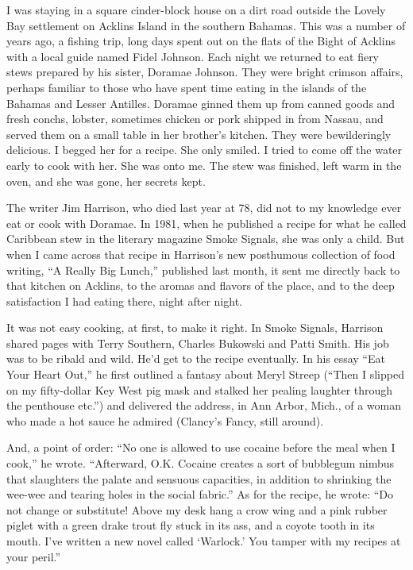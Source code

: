 I was staying in a square cinder-block house on a dirt road outside the
Lovely Bay settlement on Acklins Island in the southern Bahamas. This
was a number of years ago, a fishing trip, long days spent out on the
flats of the Bight of Acklins with a local guide named Fidel Johnson.
Each night we returned to eat fiery stews prepared by his sister,
Doramae Johnson. They were bright crimson affairs, perhaps familiar to
those who have spent time eating in the islands of the Bahamas and
Lesser Antilles. Doramae ginned them up from canned goods and fresh
conchs, lobster, sometimes chicken or pork shipped in from Nassau, and
served them on a small table in her brother's kitchen. They were
bewilderingly delicious. I begged her for a recipe. She only smiled. I
tried to come off the water early to cook with her. She was onto me. The
stew was finished, left warm in the oven, and she was gone, her secrets
kept.

The writer Jim Harrison, who died last year at 78, did not to my
knowledge ever eat or cook with Doramae. In 1981, when he published a
recipe for what he called Caribbean stew in the literary magazine Smoke
Signals, she was only a child. But when I came across that recipe in
Harrison's new posthumous collection of food writing, ``A Really Big
Lunch,'' published last month, it sent me directly back to that kitchen
on Acklins, to the aromas and flavors of the place, and to the deep
satisfaction I had eating there, night after night.

It was not easy cooking, at first, to make it right. In Smoke Signals,
Harrison shared pages with Terry Southern, Charles Bukowski and Patti
Smith. His job was to be ribald and wild. He'd get to the recipe
eventually. In his essay ``Eat Your Heart Out,'' he first outlined a
fantasy about Meryl Streep (``Then I slipped on my fifty-dollar Key West
pig mask and stalked her pealing laughter through the penthouse etc.'')
and delivered the address, in Ann Arbor, Mich., of a woman who made a
hot sauce he admired (Clancy's Fancy, still around).

And, a point of order: ``No one is allowed to use cocaine before the
meal when I cook,'' he wrote. ``Afterward, O.K. Cocaine creates a sort
of bubblegum nimbus that slaughters the palate and sensuous capacities,
in addition to shrinking the wee-wee and tearing holes in the social
fabric.'' As for the recipe, he wrote: ``Do not change or substitute!
Above my desk hang a crow wing and a pink rubber piglet with a green
drake trout fly stuck in its ass, and a coyote tooth in its mouth. I've
written a new novel called `Warlock.' You tamper with my recipes at your
peril.''

